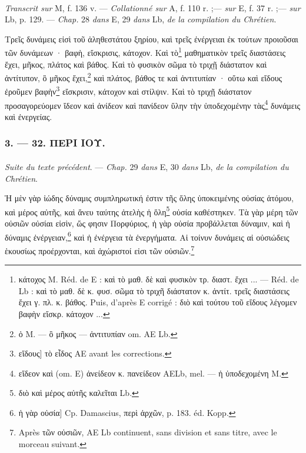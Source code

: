 \documentclass[a4paper, 11pt, oneside, polutonikogreek, french]{article}
\begin{document}
\paragraph{}
\emph{Transcrit sur} M, f. 136 v. --- \emph{Collationné sur} A, f. 110 r. ;--- \emph{sur} E, f. 37 r. ;--- \emph{sur} Lb, p. 129. --- \emph{Chap.} 28 \emph{dans} E, 29 \emph{dans} Lb, \emph{de la compilation du Chrétien}.

\bigskip

Τρεῖς δυνάμεις εἰσὶ τοῦ ἀληθεστάτου ξηρίου, καὶ τρεῖς ἐνέργειαι ἐκ τούτων προιοῦσαι τῶν δυνάμεων · βαφὴ, εἴσκρισις, κάτοχον. Καὶ τὸ\footnote{κάτοχος M. Réd. de E : καὶ τὸ μαθ. δὲ καὶ φυσικὸν τρ. διαστ. ἔχει ... --- Réd. de Lb : καὶ τὸ μαθ. δὲ κ. φυσ. σῶμα τὸ τριχῆ διάστατον κ. ἀντίτ. τρεῖς διαστάσεις ἔχει γ. πλ. κ. βάθος. Puis, d'après E corrigé : διὸ καὶ τούτου τοῦ εἴδους λέγομεν βαφὴν εἴσκρ. κάτοχον ...} μαθηματικὸν τρεῖς διαστάσεις ἔχει, μῆκος, πλάτος καὶ βάθος. Καὶ τὸ φυσικὸν σῶμα τὸ τριχῇ διάστατον καὶ ἀντίτυπον, ὃ μῆκος ἔχει,\footnote{ὁ M. --- ὃ μῆκος --- ἀντιτυπίαν om. AE Lb.} καὶ πλάτος, βάθος τε καὶ ἀντιτυπίαν · οὕτω καὶ εἴδους ἐροῦμεν βαφὴν\footnote{εἴδους] τὸ εἶδος AE avant les corrections.} εἴσκρισιν, κάτοχον καὶ στίλψιν. Καὶ τὸ τριχῇ διάστατον προσαγορεύομεν ἴδεον καὶ ἀνίδεον καὶ πανίδεον ὕλην τὴν ὑποδεχομένην τὰς\footnote{εἴδεον καὶ (om. E) ἀνείδεον κ. πανείδεον AELb, mel. --- ἡ ὑποδεχομένη M.} δυνάμεις καὶ ἐνεργείας.

\bigskip
\centerline{\EightStarTaper}
\centerline{\EightStarTaper\EightStarTaper}
\bigskip

\subsubsection{3. --- 32. ΠΕΡΙ ΙΟΥ.}
\paragraph{}
\emph{Suite du texte précédent}. --- \emph{Chap.} 29 \emph{dans} E, 30 \emph{dans} Lb, \emph{de la compilation du Chrétien}.

\bigskip

Ἡ μὲν γὰρ ἰώδης δύναμις συμπληρωτική ἐστιν τῆς ὅλης ὑποκειμένης οὐσίας ἀτόμου, καὶ μέρος αὐτῆς, καὶ ἄνευ ταύτης ἀτελὴς ἡ ὅλη\footnote{διὸ καὶ μέρος αὐτῆς καλεῖται Lb.} οὐσία καθέστηκεν. Τὰ γὰρ μέρη τῶν οὐσιῶν οὐσίαι εἰσὶν, ὥς φησιν Πορφύριος, ἡ γὰρ οὐσία προβάλλεται δύναμιν, καὶ ἡ δύναμις ἐνέργειαν,\footnote{ἡ γὰρ οὐσία] Cp. Damascius, περὶ ἀρχῶν, p. 183. éd. Kopp.} καὶ ἡ ἐνέργεια τὰ ἐνεργήματα. Αἱ τοίνυν δυνάμεις αἱ οὐσιώδεις ἑκουσίως προέρχονται, καὶ ἀχώριστοί εἰσι τῶν οὐσιῶν.\footnote{Après τῶν οὐσιῶν, AE Lb continuent, sans division et sans titre, avec le morceau suivant.}
\end{document}
